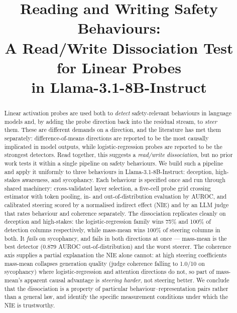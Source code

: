 \documentclass[conference]{IEEEtran}
\begin{document}
\title{Reading and Writing Safety Behaviours:\\
A Read/Write Dissociation Test for Linear Probes\\
in Llama-3.1-8B-Instruct}

\author{
}

\maketitle

\begin{abstract}
Linear activation probes are used both to \emph{detect} safety-relevant
behaviours in language models and, by adding the probe direction back into the
residual stream, to \emph{steer} them. These are different demands on a
direction, and the literature has met them separately: difference-of-means
directions are reported to be the most causally implicated in model outputs,
while logistic-regression probes are reported to be the strongest detectors.
Read together, this suggests a \emph{read/write dissociation}, but no prior work
tests it within a single pipeline on safety behaviours. We build such a pipeline
and apply it uniformly to three behaviours in Llama-3.1-8B-Instruct: deception,
high-stakes awareness, and sycophancy. Each behaviour is specified once and run
through shared machinery: cross-validated layer selection, a five-cell probe
grid crossing estimator with token pooling, in- and out-of-distribution
evaluation by AUROC, and calibrated steering scored by a normalised indirect
effect (NIE) and by an LLM judge that rates behaviour and coherence separately.
The dissociation replicates cleanly on deception and high-stakes: the
logistic-regression family wins 75\% and 100\% of detection columns
respectively, while mass-mean wins 100\% of steering columns in both. It
\emph{fails} on sycophancy, and fails in both directions at once --- mass-mean
is the best detector (0.879 AUROC out-of-distribution) and the worst steerer.
The coherence axis supplies a partial explanation the NIE alone cannot: at high
steering coefficients mass-mean collapses generation quality (judge coherence
falling to 1.0/10 on sycophancy) where logistic-regression and attention
directions do not, so part of mass-mean's apparent causal advantage is
\emph{steering harder}, not steering better. We conclude that the dissociation
is a property of particular behaviour--representation pairs rather than a
general law, and identify the specific measurement conditions under which the
NIE is trustworthy.
\end{abstract}
\end{document}
